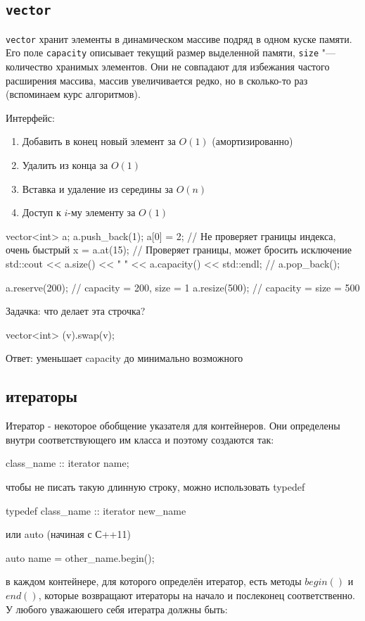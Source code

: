 \subsection{\texttt{vector}}
 
\verb'vector' хранит элементы в динамическом массиве подряд в одном куске памяти.
Его поле \verb'capacity' описывает текущий размер выделенной памяти, \verb'size' "--- количество хранимых элементов.
Они не совпадают для избежания частого расширения массива, массив увеличивается редко, но в сколько-то раз (вспоминаем курс алгоритмов).
 
Интерфейс:
\begin{enumerate}
        \item Добавить в конец новый элемент за $O(1)$ (амортизированно)
        \item Удалить из конца за $O(1)$
        \item Вставка и удаление из середины за $O(n)$
        \item Доступ к $i$-му элементу за $O(1)$
\end{enumerate}
 
\begin{cppcode}
vector<int> a;
a.push_back(1);
a[0] = 2; // Не проверяет границы индекса, очень быстрый
x = a.at(15); // Проверяет границы, может бросить исключение
std::cout << a.size() << " " << a.capacity() << std::endl;
// a.pop_back();
 
a.reserve(200); // capacity = 200, size = 1
a.resize(500); // capacity = size = 500
\end{cppcode}
Задачка:  что делает эта строчка? 
\begin{cppcode}
vector<int> (v).swap(v);
\end{cppcode}
Ответ: 
уменьшает capacity до минимально возможного
\subsection{итераторы}
Итератор - некоторое обобщение указателя для контейнеров. Они определены внутри соответствующего им класса и поэтому создаются так:
\begin{cppcode}
class_name :: iterator name;
\end{cppcode}
чтобы не писать такую длинную строку, можно использовать typedef
\begin{cppcode}
typedef class_name :: iterator new_name
\end{cppcode}
или auto (начиная с С++11)
\begin{cppcode}
auto name = other_name.begin();
\end{cppcode}
в каждом контейнере, для которого определён итератор, есть методы $begin()$ и $end()$, которые возвращают итераторы на начало и послеконец соответственно. У любого уважаюшего себя итератра должны быть:

